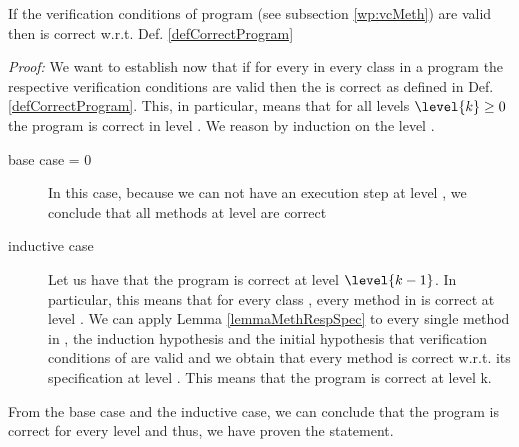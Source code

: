 \begin{vcGenCorrect1}
 If the verification conditions  of program \Program{} (see  subsection \ref{wp:vcMeth})
are valid then \Program{} is correct w.r.t. Def. \ref{defCorrectProgram}
\end{vcGenCorrect1}
\textit{Proof:}
We want to establish now  that if for every \methodd{}
 in every class \class{} in a program \Program{}  the respective verification conditions are valid then 
the \Program{} is correct as defined in Def. \ref{defCorrectProgram}.
 This, in particular, means that for all levels $\level{k} \ge 0 $ the program is correct in  level .
We reason by induction on the level . 
\begin{description} 
\item[base case  = 0]
 In this case, because we can not have an execution step at level , we conclude that all methods at level  
are correct
\item[inductive case ] Let us have that the program is correct at level $\level{k-1}$. 
In particular, this means that for every class \class{}, every method \methodd{} in \class{} is correct at level .
We can apply Lemma \ref{lemmaMethRespSpec} to every single method  \methodd{} in \Program{}, 
 the induction hypothesis  and the initial hypothesis that  verification conditions  of \methodd{} are valid and we obtain that 
every method  \methodd{} is correct w.r.t. its specification at level . This means that the program is correct at level k. 
\end{description}
From the base case and the inductive case, we can conclude that the program \Program{} is correct for every level  
and thus, we have proven the statement.
 
\Qed








